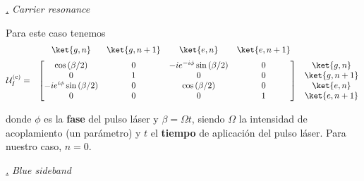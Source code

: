 \documentclass[a4paper,11pt]{article} %
\def\lp{\left(}
\def\rp{\right)}
\def\subsubiContadorIt{\par\addtocounter{subsubsection}{1}\underline{\it\thesubsubsection.}\hskip0.5cm \setcounter{subsubsubsectionIt}{0}}
\newcommand{\SubsubiIt}[1]{
		\subsubiContadorIt \textit{#1}
	}
\newcounter{subsubsubsectionIt}[subsubsection]
\begin{document}
\renewcommand{\tablename}{Tabla}

\SubsubiIt{Carrier resonance}


Para este caso tenemos 
\begin{equation*} \label{ec_ions_U_carrier}
 \begin{matrix}
    & 
    \begin{matrix}
      \makebox[\widthof{$-i e^{i \phi} \sin \lp \beta/2 \rp$}]{$\ket{g,n}$}   & 
      \ket{g,n+1} & 
      \makebox[\widthof{$-i e^{-i \phi} \sin \lp \beta/2 \rp$}]{$\ket{e,n}$}   &
      \ket{e,n+1}
    \end{matrix} 	&  \\[.5\normalbaselineskip]
    \mathcal{U}_I^{(\text{c})} = & 
    \begin{bmatrix}
        \cos \lp \beta/2 \rp  & 
        \makebox[\widthof{$\ket{g,n+1}$}]{$0$}   & 
        -i e^{-i \phi} \sin \lp \beta/2 \rp & 
        \makebox[\widthof{$\ket{e,n+1}$}]{$0$} \\
        0   & 
        \makebox[\widthof{$\ket{g,n+1}$}]{$1$}   & 
        0 & 
        \makebox[\widthof{$\ket{e,n+1}$}]{$0$} \\
        -i e^{i \phi} \sin \lp \beta/2 \rp & 
        \makebox[\widthof{$\ket{g,n+1}$}]{$0$}   & 
        \cos \lp \beta/2 \rp & 
        \makebox[\widthof{$\ket{e,n+1}$}]{$0$} \\
        0 & 
        \makebox[\widthof{$\ket{g,n+1}$}]{$0$}   & 
        0 & 
        \makebox[\widthof{$\ket{e,n+1}$}]{$1$} 
    \end{bmatrix} &
    \begin{matrix} \ket{g,n} \\ \ket{g,n+1} \\ \ket{e,n} \\ \ket{e,n+1} \end{matrix} 
\end{matrix} \,
\end{equation*}

donde $\phi$ es la \textbf{fase} del pulso láser y $\beta = \Omega t$, siendo $\Omega$ la intensidad de acoplamiento (un parámetro) y $t$ el \textbf{tiempo} de aplicación del pulso láser. Para nuestro caso, $n = 0$. 


		\SubsubiIt{Blue sideband}
		
\end{document}
